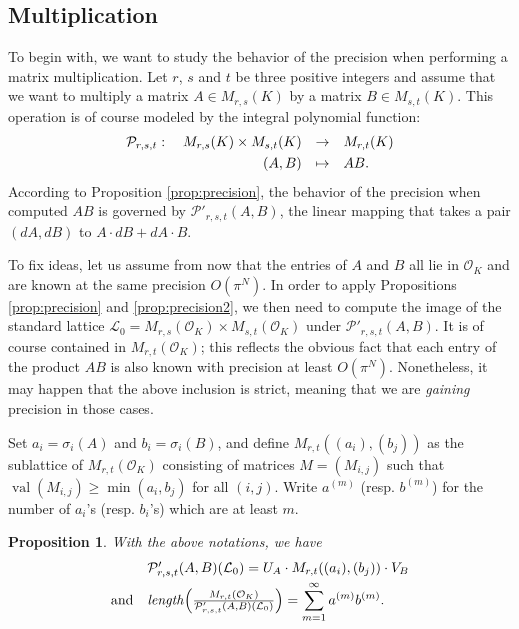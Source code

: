 \documentclass{sig-alternate}
\DeclareMathOperator{\val}{val}
\newtheorem{prop}[theo]{Proposition}
\renewcommand{\O}{\mathcal O}
\begin{document}
\subsection{Multiplication}
\label{subsec:mulmatrix}

To begin with, we want to study the behavior of the precision when 
performing a matrix multiplication. Let $r$, $s$ and $t$ be three 
positive integers and assume that we want to multiply a matrix $A \in 
M_{r,s}(K)$ by a matrix $B \in M_{s,t}(K)$. This operation is of course 
modeled by the integral polynomial function:
$$\begin{array}{rcl}
\mathcal P_{r,s,t} : \quad M_{r,s}(K) \times M_{s,t}(K) & \to & 
M_{r,t}(K) \smallskip \\
(A,B) & \mapsto & AB.
\end{array}$$
According to Proposition \ref{prop:precision}, the behavior of the precision when 
computed $AB$ is governed by $\mathcal P'_{r,s,t}(A,B)$, the linear mapping that takes a pair 
$(dA,dB)$ to $A \cdot dB + dA \cdot B$.

To fix ideas, let us assume from now that the entries of $A$ and $B$ all 
lie in $\O_K$ and are known at the same precision $O(\pi^N)$. In order 
to apply Propositions \ref{prop:precision} and \ref{prop:precision2}, we then need to compute the image 
of the standard lattice $\mathcal L_0 = M_{r,s}(\O_K) \times 
M_{s,t}(\O_K)$ under $\mathcal P'_{r,s,t}(A,B)$. It is of course 
contained in $M_{r,t}(\O_K)$; this reflects the obvious fact that each 
entry of the product $AB$ is also known with precision at least $O(\pi^N)$. 
Nonetheless, it may happen that the above inclusion is strict, meaning 
that we are \emph{gaining} precision in those cases.

Set $a_i = \sigma_i(A)$ and $b_i = \sigma_i(B)$, and define $M_{r,t}((a_i),(b_j))$ 
as the sublattice of $M_{r,t}(\O_K)$ consisting of matrices $M = (M_{i,j})$ 
such that $\val(M_{i,j}) \geq \min(a_i,b_j)$ for all $(i,j)$.  Write $a^{(m)}$ (resp. $b^{(m)}$)
for the number of $a_i$'s (resp. $b_i$'s) which are at least $m$.

\begin{prop}
\label{prop:mulmatrix}
With the above notations, we have
\[
\begin{array}{rl}
& \mathcal P'_{r,s,t}(A,B)(\mathcal L_0)
= U_A \cdot M_{r,t}((a_i),(b_j)) \cdot V_B \smallskip \\
\text{and} &
\text{\emph{length}}\Big(\frac{M_{r,t}(\O_K)}{\mathcal P'_{r,s,t}(A,B)(\mathcal L_0) }
\Big) =
\displaystyle 
\sum_{m=1}^\infty a^{(m)} b^{(m)}.
\end{array}
\]
\end{prop}
\end{document}

